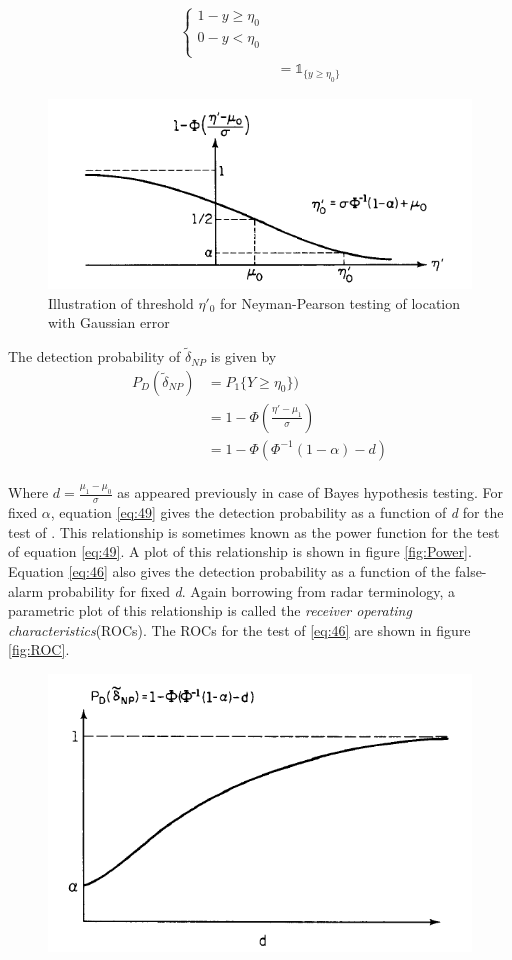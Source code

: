 \documentclass[a4paper,english,12pt]{article}
\begin{document}
\begin{exmp}
\begin{align}
				   \begin{cases}\nonumber 
				   1-y\geq\eta_0\label{eq:46} \\
				   0-y<\eta_0\\
				   \end{cases}\\
				&=\mathds{1}_{\{ y\geq\eta_0 \}}
\end{align}
\begin{figure}[h]
\centering
\includegraphics[width=0.7\linewidth]{Figures/Gauss_Neyman}
\caption{Illustration of threshold $\eta'_{0}$ for Neyman-Pearson testing of location with Gaussian error}
\label{fig:neymanerror}
\end{figure}
The detection probability of $\tilde{\delta}_{NP}$ is given by
\begin{align}
P_D(\tilde{\delta}_{NP})&=P_1\{Y\geq\eta_0\})\nonumber\\
					  &=1-\Phi(\frac{\eta'-\mu_1}{\sigma})\label{eq:49}\nonumber\\
					  &=1-\Phi(\Phi^{-1}(1-\alpha)-d)
\end{align}\\
Where $d=\frac{\mu_{1}-\mu_{0}}{\sigma}$ as appeared previously in case of Bayes hypothesis testing. For fixed $\alpha$, equation \ref{eq:49} gives the detection probability as a function of \textit{d} for the test of . This relationship is sometimes known as the power function for the test of equation \ref{eq:49}. A plot of this relationship is shown in figure \ref{fig:Power}. Equation \ref{eq:46} also gives the detection probability as a function of the false-alarm probability for fixed \textit{d}. Again borrowing from radar terminology, a parametric plot of this relationship is called the \textit{receiver operating characteristics}(ROCs). The ROCs for the test of \ref{eq:46} are shown in figure \ref{fig:ROC}.
\begin{figure}[h]
\centering
\includegraphics[width=0.5\linewidth]{Figures/Power}

\end{figure}
\end{exmp}
\end{document}
